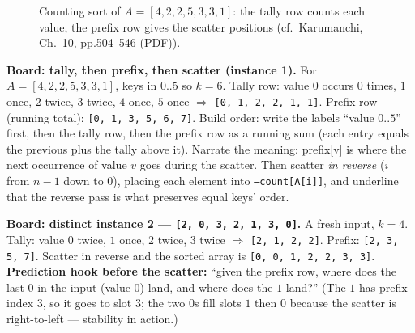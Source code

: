 \documentclass[11pt]{article}
\begin{document}
\begin{figure}[h]
  \centering
  \caption{Counting sort of $A = [4, 2, 2, 5, 3, 3, 1]$: the tally row counts each value, the prefix row gives the scatter positions (cf.\ Karumanchi, Ch.~10, pp.504--546 (PDF)).}
  \label{fig:counting}
\end{figure}

\textbf{Board: tally, then prefix, then scatter (instance 1).} For $A = [4, 2, 2, 5, 3, 3, 1]$, keys in $0..5$ so $k = 6$. Tally row: value $0$ occurs $0$ times, $1$ once, $2$ twice, $3$ twice, $4$ once, $5$ once $\Rightarrow$ \texttt{[0, 1, 2, 2, 1, 1]}. Prefix row (running total): \texttt{[0, 1, 3, 5, 6, 7]}. Build order: write the labels ``value $0..5$'' first, then the tally row, then the prefix row as a running sum (each entry equals the previous plus the tally above it). Narrate the meaning: prefix[v] is where the next occurrence of value $v$ goes during the scatter. Then scatter \emph{in reverse} ($i$ from $n-1$ down to $0$), placing each element into \texttt{--count[A[i]]}, and underline that the reverse pass is what preserves equal keys' order.

\textbf{Board: distinct instance 2 --- \texttt{[2, 0, 3, 2, 1, 3, 0]}.} A fresh input, $k = 4$. Tally: value $0$ twice, $1$ once, $2$ twice, $3$ twice $\Rightarrow$ \texttt{[2, 1, 2, 2]}. Prefix: \texttt{[2, 3, 5, 7]}. Scatter in reverse and the sorted array is \texttt{[0, 0, 1, 2, 2, 3, 3]}. \textbf{Prediction hook before the scatter:} ``given the prefix row, where does the last $0$ in the input (value $0$) land, and where does the $1$ land?'' (The $1$ has prefix index $3$, so it goes to slot $3$; the two $0$s fill slots $1$ then $0$ because the scatter is right-to-left --- stability in action.)
\end{document}
